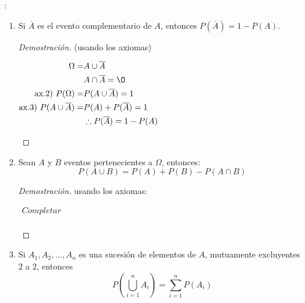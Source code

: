 \documentclass[../main.tex]{subfiles}
\begin{document}
\begin{properties} :
    \begin{enumerate}
        \item Si $\overline{A}$ es el evento complementario de $A$, entonces $P(\overline{A}) = 1 - P(A)$.
            \begin{proof}[Demostración] (usando los axiomas)\\
                \begin{center}
                    $\begin{aligned}
                        \Omega =& A \cup \overline{A}\\
                        &A \cap \overline{A} = \O\\
                        \text{ax.2) } P(\Omega) =& P(A \cup \overline{A}) = 1\\
                        \text{ax.3) } P(A \cup \overline{A}) =& P(A) + P(\overline{A}) = 1\\
                        &\therefore P(\overline{A}) = 1 - P(A)
                    \end{aligned}$
                \end{center}
            \end{proof}
        \item Sean $A$ y $B$ eventos pertenecientes a $\Omega$, entonces:
            \begin{equation*}
                P(A \cup B) = P(A) + P(B) - P(A \cap B)
            \end{equation*}
            \begin{proof}[Demostración] usando los axiomas:
                \begin{center}
                    $\begin{aligned}
                        Completar\\
                    \end{aligned}$
                \end{center}
            \end{proof}
        \item Si $A_{1}, A_{2}, \dots, A_{n}$ es una sucesión de elementos de $A$, mutuamente excluyentes $2$ a $2$, entonces
            \begin{equation*}
                P\left(\bigcup_{i=1}^{n}A_{i}\right) = \sum_{i=1}^{n}P(A_{i})
            \end{equation*}
    \end{enumerate}
\end{properties}
\end{document}
